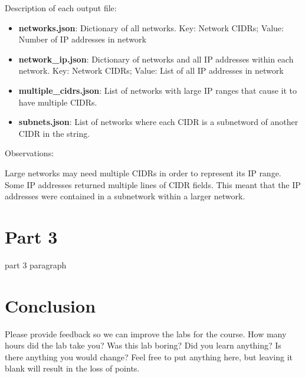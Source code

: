 \documentclass[11pt]{article}
\begin{document}
\noindent Description of each output file:
\begin{itemize}
\item\textbf{networks.json}: Dictionary of all networks. Key: Network CIDRs; Value: Number of IP addresses in network

\item\textbf{network\_ip.json}: Dictionary of networks and all IP addresses within each network. Key: Network CIDRs; Value: List of all IP addresses in network

\item\textbf{multiple\_cidrs.json}: List of networks with large IP ranges that cause it to have multiple CIDRs.

\item\textbf{subnets.json}: List of networks where each CIDR is a subnetword of another CIDR in the string.
\end{itemize}

\noindent Observations:

Large networks may need multiple CIDRs in order to represent its IP range.
Some IP addresses returned multiple lines of CIDR fields.
This meant that the IP addresses were contained in a subnetwork within a larger network.

\section*{Part 3}
\label{sec:part-3}
part 3 paragraph

\section*{Conclusion}
\label{sec:conclusion}
Please provide feedback so we can improve the labs for the course. How many
hours did the lab take you? Was this lab boring? Did you learn anything? Is
there anything you would change? Feel free to put anything here, but leaving it
blank will result in the loss of points.

\nocite{*}


\end{document}
